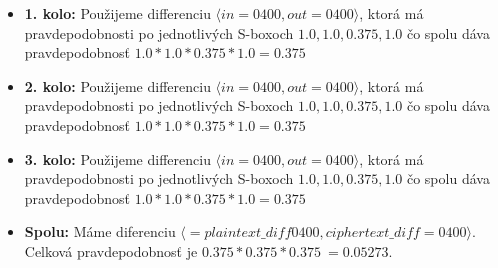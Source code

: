 \begin{itemize}
\item {\bf 1. kolo:}
Použijeme differenciu $\langle in= 0400 , out= 0400 \rangle $,
ktorá má pravdepodobnosti po jednotlivých S-boxoch $
1.0,1.0,0.375,1.0
$ čo spolu dáva pravdepodobnosť 
$ 1.0*1.0*0.375*1.0 = 0.375 $

\item {\bf 2. kolo:}
Použijeme differenciu $\langle in= 0400 , out= 0400 \rangle $,
ktorá má pravdepodobnosti po jednotlivých S-boxoch $
1.0,1.0,0.375,1.0
$ čo spolu dáva pravdepodobnosť 
$ 1.0*1.0*0.375*1.0 = 0.375 $

\item {\bf 3. kolo:}
Použijeme differenciu $\langle in= 0400 , out= 0400 \rangle $,
ktorá má pravdepodobnosti po jednotlivých S-boxoch $
1.0,1.0,0.375,1.0
$ čo spolu dáva pravdepodobnosť 
$ 1.0*1.0*0.375*1.0 = 0.375 $

\item {\bf Spolu:}  Máme diferenciu $\langle = plaintext\_diff 0400 , ciphertext\_diff= 0400 \rangle$.
Celková pravdepodobnosť je $ 0.375*0.375*0.375 ~= 0.05273 $.
\end{itemize}
